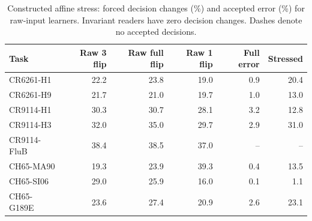 \begin{table}[t]
\centering\footnotesize
\caption{Constructed affine stress: forced decision changes (\%) and accepted error (\%) for raw-input learners. Invariant readers have zero decision changes. Dashes denote no accepted decisions.}
\setlength{\tabcolsep}{4pt}
\begin{tabular}{lrrrrr}
\toprule
Task & Raw 3 flip & Raw full flip & Raw 1 flip & Full error & Stressed \\
\midrule
CR6261-H1 & 22.2 & 23.8 & 19.0 & 0.9 & 20.4 \\
CR6261-H9 & 21.7 & 21.0 & 19.7 & 1.0 & 13.0 \\
CR9114-H1 & 30.3 & 30.7 & 28.1 & 3.2 & 12.8 \\
CR9114-H3 & 32.0 & 35.0 & 29.7 & 2.9 & 31.0 \\
CR9114-FluB & 38.4 & 38.5 & 37.0 & -- & -- \\
CH65-MA90 & 19.3 & 23.9 & 39.3 & 0.4 & 13.5 \\
CH65-SI06 & 29.0 & 25.9 & 16.0 & 0.1 & 1.1 \\
CH65-G189E & 23.6 & 27.4 & 20.9 & 2.6 & 23.1 \\
\bottomrule
\end{tabular}
\end{table}
